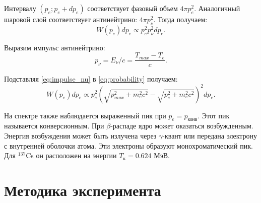 \documentclass[a4paper, 12pt]{article} %
\begin{document}
	Интервалу $(p_e; p_e + d p_e)$ соответствует фазовый объем $4 \pi p_e^2$. Аналогичный шаровой слой соответствует антинейтрино: $4 \pi p_{\nu}^2$. Тогда получаем:
	\begin{equation}
		W(p_e) dp_e \propto p_e^2 p_{\nu}^2 dp_e.
		\label{eq:probability}
	\end{equation}
	
	Выразим импульс антинейтрино:
	\begin{equation}
		p_{\nu} = E_{\nu} / c = \frac{T_{max} - T_e}{c}.
		\label{eq:impulse_nu}
	\end{equation}
	
	Подставляя \eqref{eq:impulse_nu} в \eqref{eq:probability} получаем:
	\begin{equation}
		W(p_e) dp_e \propto p_e^2 (\sqrt{p_{max}^2 + m_e^2 c^2} - \sqrt{p_e^2 + m_e^2 c^2})^2 dp_e.
	\end{equation}
	
	На спектре также наблюдается выраженный пик при $p_e = p_{\text{конв}}$. Этот пик называется конверсионным. При $\beta$-распаде ядро может оказаться возбужденным. Энергия возбуждения может быть излучена через $\gamma$-квант или передана электрону с внутренней оболочки атома. Эти электроны образуют монохроматический пик. Для $^{137}$Cs он расположен на энергии $T_{\text{к}} = 0.624$ МэВ.
	
\section{Методика эксперимента}
	
\end{document}
